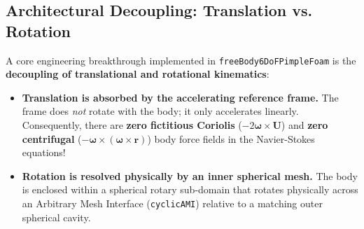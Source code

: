 \documentclass[11pt,a4paper]{article}
\newcommand{\vect}[1]{\mathbf{#1}}
\begin{document}
\subsection{Architectural Decoupling: Translation vs. Rotation}
A core engineering breakthrough implemented in \texttt{freeBody6DoFPimpleFoam} is the \textbf{decoupling of translational and rotational kinematics}:
\begin{itemize}
    \item \textbf{Translation is absorbed by the accelerating reference frame.} The frame does \emph{not} rotate with the body; it only accelerates linearly. Consequently, there are \textbf{zero fictitious Coriolis} ($-2\bm{\omega}\times\vect{U}$) and \textbf{zero centrifugal} ($-\bm{\omega}\times(\bm{\omega}\times\vect{r})$) body force fields in the Navier-Stokes equations!
    \item \textbf{Rotation is resolved physically by an inner spherical mesh.} The body is enclosed within a spherical rotary sub-domain that rotates physically across an Arbitrary Mesh Interface (\texttt{cyclicAMI}) relative to a matching outer spherical cavity.
\end{itemize}
\end{document}
